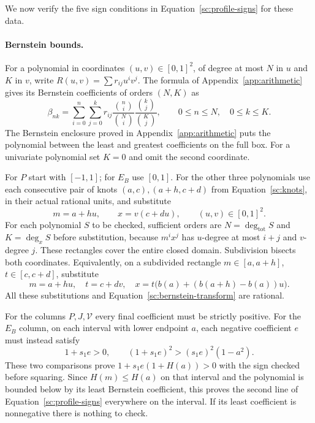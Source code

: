 We now verify the five sign conditions in
Equation~\eqref{sc:profile-signs} for these data.

\paragraph{Bernstein bounds.}
For a polynomial in coordinates $(u,v)\in[0,1]^2$, of degree at most
$N$ in $u$ and $K$ in $v$, write $R(u,v)=\sum r_{ij}u^iv^j$.
The formula of Appendix~\ref{app:arithmetic} gives its Bernstein
coefficients of orders $(N,K)$ as
\begin{equation}\label{sc:bernstein-transform}
 \beta_{nk}=\sum_{i=0}^n\sum_{j=0}^k
 r_{ij}\frac{\binom ni}{\binom Ni}\frac{\binom kj}{\binom Kj},
 \qquad 0\leq n\leq N,\quad0\leq k\leq K.
\end{equation}
The Bernstein enclosure proved in Appendix~\ref{app:arithmetic} puts
the polynomial between the least and greatest coefficients on the full box.
For a univariate polynomial set $K=0$ and omit the second coordinate.

For $P$ start with $[-1,1]$; for $E_B$ use $[0,1]$.
For the other three polynomials use each consecutive pair of knots
$(a,c),(a+h,c+d)$ from Equation~\eqref{sc:knots}, in their actual rational units,
and substitute
\[
 m=a+hu,\qquad x=v(c+du),\qquad (u,v)\in[0,1]^2.
\]
For each polynomial $S$ to be checked, sufficient orders are
$N=\deg_{\mathrm{tot}}S$ and $K=\deg_xS$ before substitution,
because $m^ix^j$ has $u$-degree at most $i+j$
and $v$-degree $j$.  These rectangles cover the entire closed domain.
Subdivision bisects both coordinates.  Equivalently, on a subdivided
rectangle $m\in[a,a+h]$, $t\in[c,c+d]$, substitute
\[
 m=a+hu,\quad t=c+dv,\quad
 x=t\bigl(b(a)+(b(a+h)-b(a))u\bigr).
\]
All these substitutions and Equation~\eqref{sc:bernstein-transform} are rational.

For the columns $P,J,\mathcal V$ every final coefficient must be strictly
positive.  For the $E_B$ column, on each interval with lower endpoint $a$,
each negative coefficient $e$ must instead satisfy
\begin{equation}\label{sc:E-test}
 1+s_1e>0,\qquad (1+s_1e)^2>(s_1e)^2(1-a^2).
\end{equation}
These two comparisons prove $1+s_1e(1+H(a))>0$ with the sign checked
before squaring.  Since $H(m)\leq H(a)$ on that interval and the polynomial
is bounded below by its least Bernstein coefficient, this proves the
second line of Equation~\eqref{sc:profile-signs} everywhere on the interval.
If its least coefficient is nonnegative there is nothing to check.

